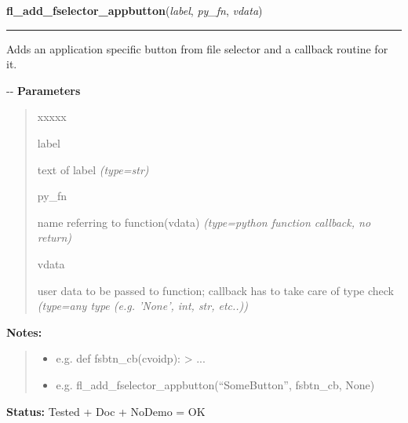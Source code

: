     \label{xformslib:flgoodies:fl_add_fselector_appbutton}

    \vspace{0.5ex}

\hspace{.8\funcindent}\begin{boxedminipage}{\funcwidth}

    \raggedright \textbf{fl\_add\_fselector\_appbutton}(\textit{label}, \textit{py\_fn}, \textit{vdata})

    \vspace{-1.5ex}

    \rule{\textwidth}{0.5\fboxrule}
\setlength{\parskip}{2ex}

Adds an application specific button from file selector and a callback
routine for it.

-{}-
\setlength{\parskip}{1ex}
      \textbf{Parameters}
      \vspace{-1ex}

      \begin{quote}
        \begin{Ventry}{xxxxx}

          \item[label]


text of label
            {\it (type=str)}

          \item[py\_fn]


name referring to function(vdata)
            {\it (type=python function callback, no return)}

          \item[vdata]


user data to be passed to function; callback has to take care of
type check
            {\it (type=any type (e.g. 'None', int, str, etc..))}

        \end{Ventry}

      \end{quote}

\textbf{Notes:}
\begin{quote}
  \begin{itemize}

  \item
    \setlength{\parskip}{0.6ex}

e.g. def fsbtn\_cb(cvoidp): > ...


  \item 
e.g. fl\_add\_fselector\_appbutton(``SomeButton'', fsbtn\_cb, None)


\end{itemize}

\end{quote}

\textbf{Status:} 
Tested + Doc + NoDemo = OK


    \end{boxedminipage}

